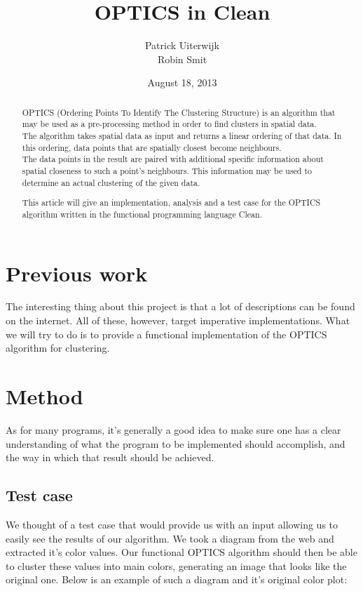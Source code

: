 \documentclass[12pt,a4paper]{article}
\title{OPTICS in Clean}
\date{August 18, 2013}
\author{Patrick Uiterwijk\\Robin Smit}
\begin{document}
\maketitle
\clearpage

\begin{abstract}
OPTICS (Ordering Points To Identify The Clustering Structure) is an algorithm that may be used as a pre-processing method in order to find clusters in spatial data.\\
The algorithm takes spatial data as input and returns a linear ordering of that data. In this ordering, data points that are spatially closest become neighbours.\\
The data points in the result are paired with additional specific information about spatial closeness to such a point's neighbours. This information may be used to determine an actual clustering of the given data.

This article will give an implementation, analysis and a test case for the OPTICS algorithm written in the functional programming language Clean.
\end{abstract}
\clearpage

\tableofcontents
\clearpage

\section{Previous work}
The interesting thing about this project is that a lot of descriptions can be found on the internet. All of these, however, target imperative implementations. What we will try to do is to provide a functional implementation of the OPTICS algorithm for clustering.

\clearpage
\section{Method}
As for many programs, it's generally a good idea to make sure one has a clear understanding of what the program to be implemented should accomplish, and the way in which that result should be achieved.

\subsection{Test case}
We thought of a test case that would provide us with an input allowing us to easily see the results of our algorithm. We took a diagram from the web and extracted it's color values. Our functional OPTICS algorithm should then be able to cluster these values into main colors, generating an image that looks like the original one. Below is an example of such a diagram and it's original color plot:\\
\end{document}
